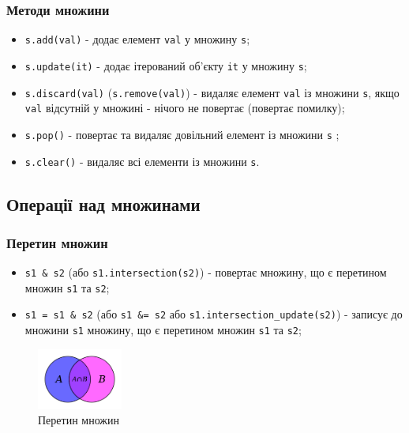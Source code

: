 \begin{frame}
\frametitle{Методи множини}
\begin{itemize}
\item \texttt{s.add(val)} - додає елемент \texttt{val} у множину \texttt{s};
  \item \texttt{s.update(it)} - додає ітерований об'єкту \texttt{it} у множину \texttt{s};
  \item \texttt{s.discard(val)} (\texttt{s.remove(val)}) - видаляє елемент \texttt{val} із множини \texttt{s}, якщо \texttt{val} відсутній у множині - нічого не повертає (повертає помилку);
  \item \texttt{s.pop()} - повертає та видаляє довільний елемент із множини \texttt{s} ;
  \item \texttt{s.clear()} - видаляє всі елементи із множини \texttt{s}.
\end{itemize}

\end{frame}

 \subsection{Операції над множинами} 
\begin{frame}
\frametitle{Перетин множин}
\begin{itemize}
  \item \texttt{s1 \& s2} (або \texttt{s1.intersection(s2)}) - повертає множину, що є перетином множин \texttt{s1} та \texttt{s2};
  \item \texttt{s1 = s1 \& s2} (або \texttt{s1 \&= s2} або \texttt{s1.intersection\_update(s2)}) - записує до множини \texttt{s1} множину, що є перетином множин \texttt{s1} та \texttt{s2};
  \end{itemize}
 \begin{figure}
\begin{center}
 \includegraphics[width=0.25\textwidth]{pictures/intersection.png}
\caption{Перетин множин}
\label{intersection} 
\end{center}
\end{figure} 
  
\end{frame}


